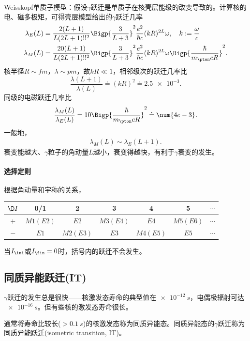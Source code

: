 Weisskopf单质子模型：假设$\gamma$跃迁是单质子在核壳层能级的改变导致的。计算核的电、磁多极矩，可得壳层模型给出的$\gamma$跃迁几率
\begin{align*}
	\lambda_E(L)&=\frac{2(L+1)}{L(2L+1)!!^2}\Bigp{\frac{3}{L+3}}^2\frac{e^2}{\hbar c}(kR)^{2L}\omega,\quad k:=\frac\omega{c}\\
	\lambda_M(L)&=\frac{20(L+1)}{L(2L+1)!!^2}\Bigp{\frac{3}{L+3}}^2\frac{e^2}{\hbar c}(kR)^{2L}\omega\Bigp{\frac\hbar{m_\pton cR}}^2.
\end{align*}
核半径$R\sim\si{fm}$，$\lambda\sim\si{pm}$，故$kR\ll 1$，相邻级次的跃迁几率比
\[
	\frac{\lambda(L+1)}{\lambda(L)}\doteq(kR)^2\doteq\num{2.5e-3}.
\]
同级的电磁跃迁几率比
\[
	\frac{\lambda_M(L)}{\lambda_E(L)}=10\Bigp{\frac\hbar{m_\pton cR}}^2\doteq\num{4e-3}.
\]
一般地，
\begin{align}
	\lambda_M(L)\sim\lambda_E(L+1).
\end{align}
衰变能越大、$\gamma$粒子的角动量$L$越小，衰变得越快，有利于$\gamma$衰变的发生。%

\paragraph{选择定则}根据角动量和宇称的关系，
\begin{center}
	\begin{tabular}{ccccccc}
		\toprule
		$\D I$&0/1&2&3&4&5&$\cdots$\\
		\midrule
		$+$&$M1(E2)$&$E2$&$M3(E4)$&$E4$&$M5(E6)$&$\cdots$\\
		$-$&$E1$&$M2(E3)$&$E3$&$M4(E5)$&$E5$&$\cdots$\\
		\bottomrule
	\end{tabular}
\end{center}
\begin{remark}
	当$I_\ini$或$I_\fin=0$时，括号内的跃迁不会发生。
\end{remark}

\subsection{同质异能跃迁(IT)}

$\gamma$跃迁的发生总是很快——核激发态寿命的典型值在$\SI{e-12}{s}$，电偶极辐射可达$\SI{e-16}{s}$。但有些核的激发态寿命很长。

通常将寿命比较长($>\SI{0.1}{s}$)的核激发态称为同质异能态。同质异能态的$\gamma$跃迁称为同质异能跃迁(isometric transition, IT)。

